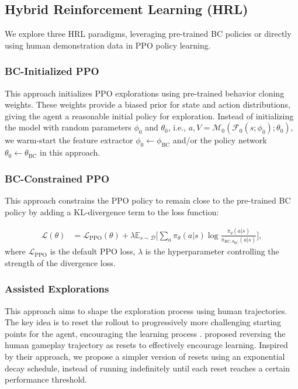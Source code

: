 \documentclass{article}
\begin{document}
\subsection{Hybrid Reinforcement Learning (HRL)}
We explore three HRL paradigms, leveraging pre-trained BC policies or 
directly using human demonstration data in PPO policy learning.

\subsubsection{BC-Initialized PPO}
This approach initializes PPO explorations using pre-trained behavior 
cloning weights. These weights provide a biased prior for state and 
action distributions, giving the agent a reasonable initial policy 
for exploration. 
Instead of initializing the model with random parameters 
$\phi_0$ and $\theta_0$, i.e., $a, V = \mathcal{M}_0(\mathcal{F}_0(s;\phi_0); 
\theta_0)$, we warm-start the feature extractor $\phi_0 \leftarrow 
\phi_{\text{BC}}$ and/or the policy network $\theta_0 \leftarrow 
\theta_{\text{BC}}$ in this approach.

\subsubsection{BC-Constrained PPO}
This approach constrains the PPO policy to remain close to the pre-trained BC 
policy by adding a KL-divergence term to the loss function:

\begin{align*}
      \mathcal{L}(\theta) 
      &= \mathcal{L}_{\text{PPO}}(\theta) +
      \lambda \mathbb{E}_{s \sim \mathcal{D}} \bigg[ \sum_{a} \pi_{\theta}(a | s) \log 
      \frac{\pi_{\theta}(a | s)}{\pi_{\text{BC}, \theta_{\text{BC}}}(a | s)} \bigg],
\end{align*}
where $\mathcal{L}_{\text{PPO}}$ is the default PPO loss, $\lambda$ is the hyperparameter
controlling the strength of the divergence loss.

\subsubsection{Assisted Explorations}
This approach aims to shape the exploration process using human trajectories. 
The key idea is to reset the rollout to progressively more challenging starting 
points for the agent, encouraging the learning process \cite{florensa2018reversecurriculumgenerationreinforcement}. 
\cite{salimans2018learningmontezumasrevengesingle} proposed reversing the human 
gameplay trajectory as resets to effectively encourage learning. Inspired by 
their approach, we propose a simpler version of resets using an exponential 
decay schedule, instead of running indefinitely until each reset reaches a 
certain performance threshold.
\end{document}
